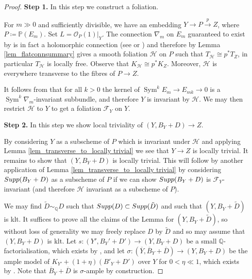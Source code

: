 \documentclass[12pt]{amsart}
\theoremstyle{plain}
\theoremstyle{definition}
\def\Sym{\operatorname{Sym}}
\begin{document}
\begin{proof}

{\bf Step 1.} In this step we construct a foliation. 

For $m \gg 0$ and sufficiently divisible, 
we have an embedding $Y \rightarrow P  \xrightarrow{p} Z$, where $P\coloneqq \mathbb P(E_m)$.  
Set $L = \mathcal O_P(1) \vert_Y$.
The connection $\nabla_m$ on $E_m$ guaranteed to exist
by \cite[\S~3]{Simpson92} is in fact a holomorphic connection 
(see \cite{MR4376097} or  \cite[Theorem 3.5]{Ou21})
and therefore by Lemma \ref{lem_flatconnsummary} gives a smooth foliation $\mathcal H$ on $P$
such that $T_{\mathcal H} \cong p^*T_Z$, in particular $T_{\mathcal H}$ is locally free.
Observe that $K_{\mathcal H} \cong p^*K_Z$.
Moreover, $\mathcal H$ is everywhere transverse to 
the fibres of $P \rightarrow Z$.


It follows from \cite[Corollary 3.10]{Ou21} that for all $k>0$ the kernel of 
$\Sym^kE_m \rightarrow E_{mk} \rightarrow 0$
is a
$\Sym^k\nabla_m$-invariant subbundle, and therefore  
$Y$ is invariant by $\mathcal H$.
We may then restrict $\mathcal H$ to $Y$ to get a foliation $\mathcal F_Y$ on $Y$.


	{\bf Step 2. } In this step we show local triviality of $(Y, B_Y+D) \rightarrow Z$. 

By considering $Y$ as a subscheme of $P$ which is invariant under $\mathcal H$ and applying Lemma 
\ref{lem_transverse_to_locally trivial} we see that $Y \rightarrow Z$ is locally trivial.
It remains to show that $(Y, B_Y+D)$ is locally trivial.  This will follow by another application 
of Lemma \ref{lem_transverse_to_locally trivial} by considering ${\rm Supp}(B_Y+D)$ as a subscheme of $P$
if we can show ${\rm Supp}(B_Y+D)$ is $\mathcal F_Y$-invariant (and therefore $\mathcal H$ invariant as a subscheme of $P$).

We may find $\tilde{D} \sim_{\mathbb Q} D$ such that ${\rm Supp}(D) \subset {\rm Supp}(\tilde{D})$ and such that 
$(Y, B_Y+\tilde{D})$ is klt.   It suffices to prove all the claims of the Lemma for $(Y, B_Y+\tilde{D})$, so 
without loss of generality we may freely replace $D$ by $\tilde{D}$ and so may assume that $(Y, B_Y+D)$ is klt.
Let $s\colon (Y', B_Y'+D') \rightarrow (Y, B_Y+D)$ be a 
small $\mathbb Q$-factorialisation, which exists by \cite[Corollary 1.4.4]{BCHM06},
and let 
$\sigma\colon (\overline{Y}, \overline{B}_Y+\overline{D}) \rightarrow (Y, B_Y+D)$
be the ample model of $K_{Y'}+(1+\eta)(B'_Y+D')$ over $Y$ for $0<\eta \ll 1$, which exists 
by \cite[Theorem 1.2]{BCHM06}.
Note that $\overline{B}_Y+\overline{D}$ is $\sigma$-ample by construction.


\end{proof}
\end{document}
